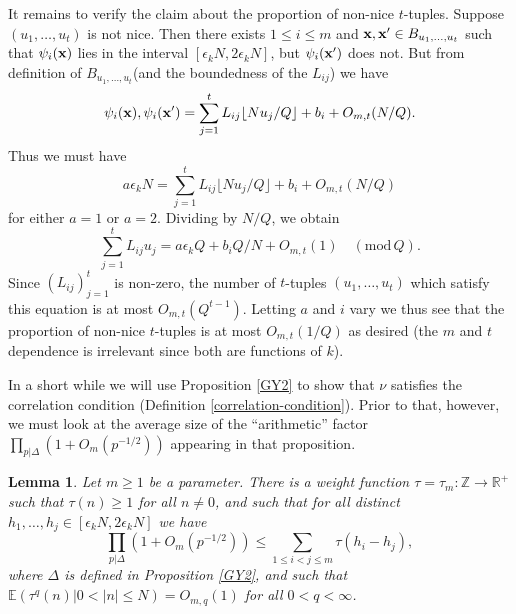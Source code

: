 \documentclass[12pt,a4paper,reqno]{amsart}
\numberwithin{equation}{section}
\theoremstyle{plain}
\newtheorem{lemma}[subsection]{Lemma}
\theoremstyle{definition}
\renewcommand{\leq}{\leqslant}
\renewcommand{\geq}{\geqslant}
\newcommand{\md}[1]{\ensuremath{(\mbox{mod}\, #1)}}
\def\Z{{\mathbb Z}}
\def\E{{\mathbb E}}
\def\R{{\mathbb R}}
\def\x{{\bf x}}
\def\ni{\noindent}
\def\endproof{\hfill{\usebox{\proofbox}}}
\begin{document}
\ni It remains to verify the claim about the proportion of non-nice $t$-tuples.
Suppose $(u_1,\ldots,u_t)$ is not nice. Then there exists $1 \leq i \leq m$ and $\x, \x' \in B_{u_1,\ldots,u_t}$ such that
$\psi_i(\x)$ lies in the interval $[\epsilon_k N, 2\epsilon_k N]$, but $\psi_i(\x')$ does not.  But from definition of $B_{u_1,\ldots,u_t}$(and the boundedness of the $L_{ij}$)  we have
$$ \psi_i(\x), \psi_i(\x') = \sum_{j=1}^t L_{ij}\lfloor Nu_j/Q\rfloor + b_i + O_{m,t}(N/Q). $$
Thus we must have
$$ a \epsilon_k N = \sum_{j=1}^t L_{ij}\lfloor Nu_j/Q\rfloor + b_i + O_{m,t}(N/Q)$$
for either $a=1$ or $a=2$.  Dividing by $N/Q$, we obtain
$$ \sum_{j=1}^t L_{ij} u_j = a \epsilon_k Q + b_i Q/N + O_{m,t}(1) \quad \md{Q}.$$
Since $(L_{ij})_{j=1}^t$ is non-zero, the number of $t$-tuples $(u_1,\ldots,u_t)$ which satisfy this equation is at most
$O_{m,t}(Q^{t-1})$.  Letting $a$ and $i$ vary we thus see that the proportion of non-nice $t$-tuples is at most $O_{m,t}(1/Q)$
as desired (the $m$ and $t$ dependence is irrelevant since both are functions of $k$).
\endproof\vspace{11pt}

\ni In a short while we will use Proposition \ref{GY2} to show that $\nu$ satisfies the correlation condition (Definition \ref{correlation-condition}). Prior to that, however, we must look at the average size of the ``arithmetic'' factor $\prod_{p | \Delta} (1 + O_m(p^{-1/2}))$ appearing in that proposition.

\begin{lemma}\label{additive-weights}  Let $m \geq 1$ be a parameter.
There is a weight function $\tau = \tau_m: \Z \to \R^+$ such that $\tau(n) \geq 1$ for all $n \neq 0$, and such that
for all distinct $h_1,\ldots,h_j \in [\epsilon_k N, 2\epsilon_k N]$ we have
\[ \prod_{p | \Delta}(1 + O_m(p^{-1/2})) \leq \sum_{1 \leq i < j \leq m} \tau(h_i - h_j),\]
where $\Delta$ is defined in Proposition \ref{GY2},
and such that $\E( \tau^q(n) | 0 < |n| \leq N ) = O_{m,q}(1)$ for all $0< q < \infty$.
\end{lemma}
\end{document}
